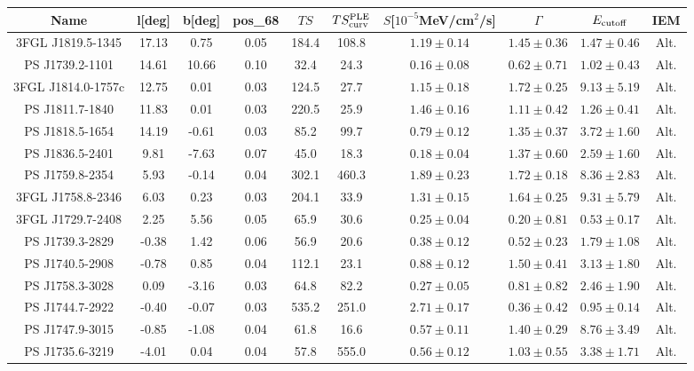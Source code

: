 \begin{table*}
\center
\begin{tabular}{|c|c|c|c|c|c|c|c|c|c|}
\hline
Name & l[deg]& b[deg] & pos\_68 & $TS$  & $TS^{\rm{PLE}}_{\rm{curv}}$  & $S$[$10^{-5}$MeV/cm$^2$/s] & $\Gamma$ & $E_{\rm{cutoff}}$ & IEM\\
\hline
\hline
  3FGL J1819.5-1345 & 17.13 & 0.75 & 0.05 & 184.4 & 108.8 & $1.19\pm0.14$ & $1.45\pm0.36$ & $1.47\pm0.46$ & Alt. \\
\hline 
 PS J1739.2-1101 & 14.61 & 10.66 & 0.10 & 32.4 & 24.3 & $0.16\pm0.08$ & $0.62\pm0.71$ & $1.02\pm0.43$ & Alt. \\
\hline 
 3FGL J1814.0-1757c & 12.75 & 0.01 & 0.03 & 124.5 & 27.7 & $1.15\pm0.18$ & $1.72\pm0.25$ & $9.13\pm5.19$ & Alt. \\
\hline 
 PS J1811.7-1840 & 11.83 & 0.01 & 0.03 & 220.5 & 25.9 & $1.46\pm0.16$ & $1.11\pm0.42$ & $1.26\pm0.41$ & Alt. \\
\hline 
 PS J1818.5-1654 & 14.19 & -0.61 & 0.03 & 85.2 & 99.7 & $0.79\pm0.12$ & $1.35\pm0.37$ & $3.72\pm1.60$ & Alt. \\
\hline 
 PS J1836.5-2401 & 9.81 & -7.63 & 0.07 & 45.0 & 18.3 & $0.18\pm0.04$ & $1.37\pm0.60$ & $2.59\pm1.60$ & Alt. \\
\hline 
 PS J1759.8-2354 & 5.93 & -0.14 & 0.04 & 302.1 & 460.3 & $1.89\pm0.23$ & $1.72\pm0.18$ & $8.36\pm2.83$ & Alt. \\
\hline 
 3FGL J1758.8-2346 & 6.03 & 0.23 & 0.03 & 204.1 & 33.9 & $1.31\pm0.15$ & $1.64\pm0.25$ & $9.31\pm5.79$ & Alt. \\
\hline 
 3FGL J1729.7-2408 & 2.25 & 5.56 & 0.05 & 65.9 & 30.6 & $0.25\pm0.04$ & $0.20\pm0.81$ & $0.53\pm0.17$ & Alt. \\
\hline 
 PS J1739.3-2829 & -0.38 & 1.42 & 0.06 & 56.9 & 20.6 & $0.38\pm0.12$ & $0.52\pm 0.23$ & $1.79\pm1.08$ & Alt. \\
\hline 
 PS J1740.5-2908 & -0.78 & 0.85 & 0.04 & 112.1 & 23.1 & $0.88\pm0.12$ & $1.50\pm0.41$ & $3.13\pm1.80$ & Alt. \\
\hline 
 PS J1758.3-3028 & 0.09 & -3.16 & 0.03 & 64.8 & 82.2 & $0.27\pm0.05$ & $0.81\pm0.82$ & $2.46\pm1.90$ & Alt. \\
\hline 
 PS J1744.7-2922 & -0.40 & -0.07 & 0.03 & 535.2 & 251.0 & $2.71\pm0.17$ & $0.36\pm0.42$ & $0.95\pm0.14$ & Alt. \\
\hline 
 PS J1747.9-3015 & -0.85 & -1.08 & 0.04 & 61.8 & 16.6 & $0.57\pm0.11$ & $1.40\pm0.29$ & $8.76\pm3.49$ & Alt. \\
\hline 
 PS J1735.6-3219 & -4.01 & 0.04 & 0.04 & 57.8 & 555.0 & $0.56\pm0.12$ & $1.03\pm0.55$ & $3.38\pm1.71$ & Alt. \\

\end{tabular}
\end{table*}
